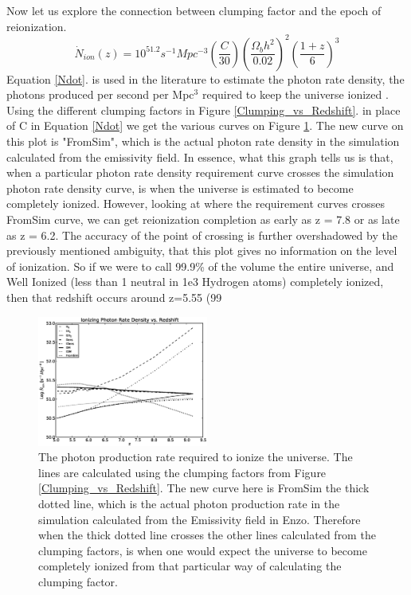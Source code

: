 Now let us explore the connection between clumping factor and the epoch of reionization.
\begin{equation}
\label{Ndot}
\dot{N}_{ion}(z)=10^{51.2}s^{-1}Mpc^{-3}\left(\frac{C}{30}\right)\left(\frac{\Omega_b h^2}{0.02}\right)^{2}\left(\frac{1+z}{6}\right)^{3}
\end{equation}
Equation \ref{Ndot}. is used in the literature to estimate the photon rate density, the photons produced per second per Mpc$^3$ required to keep the universe ionized \citep{FanCarilliKeating2006}.  Using the different clumping factors in Figure \ref{Clumping_vs_Redshift}. in place of C in Equation \ref{Ndot} we get the various curves on Figure \ref{Photon_vs_Redshift}.  The new curve on this plot is "FromSim", which is the actual photon rate density in the simulation calculated from the emissivity field.  In essence, what this graph tells us is that, when a particular photon rate density requirement curve crosses the simulation photon rate density curve, is when the universe is estimated to become completely ionized.  However, looking at where the requirement curves crosses FromSim curve, we can get reionization completion as early as z = 7.8 or as late as z = 6.2.  The accuracy of the point of crossing is further overshadowed by the previously mentioned ambiguity, that this plot gives no information on the level of ionization.  So if we were to call 99.9\% of the volume the entire universe, and Well Ionized (less than 1 neutral in 1e3 Hydrogen atoms) completely ionized, then that redshift occurs around z=5.55 (99%

\begin{figure}
\label{Photon_vs_Redshift}
  \includegraphics[width=0.5\textwidth]{bPhoton_to_ionize.eps}
  \caption{\footnotesize The photon production rate required to ionize the universe.  The lines are calculated using the clumping factors from Figure \ref{Clumping_vs_Redshift}.  The new curve here is FromSim the thick dotted line, which is the actual photon production rate in the simulation calculated from the Emissivity field in Enzo.  Therefore when the thick dotted line crosses the other lines calculated from the clumping factors, is when one would expect the universe to become completely ionized from that particular way of calculating the clumping factor.}
\end{figure}


